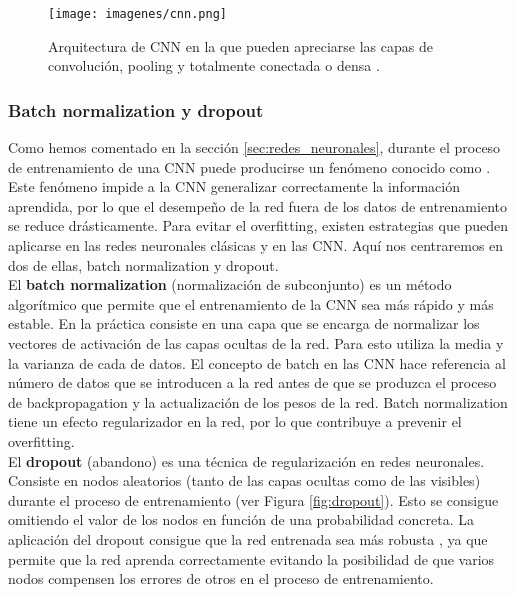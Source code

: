 \begin{figure}[ht!]
    \centering
    \texttt{[image: imagenes/cnn.png]}
    \caption[Arquitectura de CNN.]{Arquitectura de CNN en la que pueden apreciarse las capas de convolución, pooling y totalmente conectada o densa \cite{saha_2018}.}
    \label{fig:fc}
\end{figure}

\subsubsection{Batch normalization y dropout}
Como hemos comentado en la sección \ref{sec:redes_neuronales}, durante el proceso de entrenamiento de una CNN puede producirse un fenómeno conocido como . Este fenómeno impide a la CNN generalizar correctamente la información aprendida, por lo que el desempeño de la red fuera de los datos de entrenamiento se reduce drásticamente. Para evitar el overfitting, existen estrategias que pueden aplicarse en las redes neuronales clásicas y en las CNN. Aquí nos centraremos en dos de ellas, batch normalization y dropout.\\

El \textbf{batch normalization} (normalización de subconjunto) es un método algorítmico que permite que el entrenamiento de la CNN sea más rápido y más estable. En la práctica consiste en una capa que se encarga de normalizar los vectores de activación de las capas ocultas de la red. Para esto utiliza la media y la varianza de cada  de datos. El concepto de batch en las CNN hace referencia al número de datos que se introducen a la red antes de que se produzca el proceso de backpropagation y la actualización de los pesos de la red. Batch normalization tiene un efecto regularizador en la red, por lo que contribuye a prevenir el overfitting.\\

El \textbf{dropout} (abandono) es una técnica de regularización en redes neuronales. Consiste en  nodos aleatorios (tanto de las capas ocultas como de las visibles) durante el proceso de entrenamiento (ver Figura \ref{fig:dropout}). Esto se consigue omitiendo el valor de los nodos en función de una probabilidad concreta. La aplicación del dropout consigue que la red entrenada sea más robusta \cite{nelson_2018}, ya que permite que la red aprenda correctamente evitando la posibilidad de que varios nodos compensen los errores de otros en el proceso de entrenamiento.

